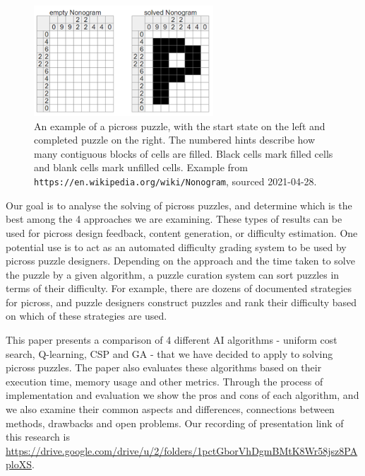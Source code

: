 \documentclass{svproc}
\begin{document}
\begin{figure}[h]
  \centering
  \includegraphics[width=0.6\textwidth]{picross1.png}
  \caption{An example of a picross puzzle, with the start state on the left and completed puzzle on the right. The numbered hints describe how many contiguous blocks of cells are filled. Black cells mark filled cells and blank cells mark unfilled cells. Example from \texttt{https://en.wikipedia.org/wiki/Nonogram}, sourced 2021-04-28.}
\end{figure}

Our goal is to analyse the solving of picross puzzles, and determine which is the best among the 4 approaches we are examining. These types of results can be used for picross design feedback, content generation, or difficulty estimation.
One potential use is to act as an automated difficulty grading system to be used by picross puzzle designers. Depending on the approach and the time taken to solve the puzzle by a given algorithm, a puzzle curation system can sort puzzles in terms of their difficulty.
For example, there are dozens of documented strategies for picross\cite{picross1}, and puzzle designers construct puzzles and rank their difficulty based on which of these strategies are used\cite{picross2}.

This paper presents a comparison of 4 different AI algorithms - uniform cost search, Q-learning, CSP and GA - that we  have decided to apply to solving picross puzzles.
The paper also evaluates these algorithms based on their execution time, memory usage and other metrics.
Through the process of implementation and evaluation we show the pros and cons of each algorithm, and we also examine their common aspects and differences, connections between methods, drawbacks and open problems.
Our recording of presentation link of this research is \url{https://drive.google.com/drive/u/2/folders/1pctGborVhDgmBMtK8Wr58jsz8PAploXS}.
\end{document}
